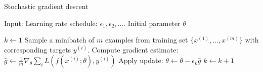 \begin{algorithm}
    \caption{Stochastic gradient descent}\label{alg:SGD}
    \begin{algorithmic}
        \State{} Input: Learning rate schedule: $\epsilon_1, \epsilon_2, \ldots$. Initial parameter $\theta$

        \State{} $k \leftarrow 1$
            \State{} Sample a minibatch of $m$ examples from training set $\{x^{(1)}, \ldots, x^{(m)}\}$ with corresponding targets $y^{(i)}$.
            \State{} Compute gradient estimate:
            \State{} $\hat{g} \leftarrow \frac{1}{m}\nabla_\theta \sum_i L(f(x^{(i)}; \theta), y^{(i)})$
            \State{} Apply update:
            \State{} $\theta \leftarrow \theta - \epsilon_k \hat{g}$
            \State{} $k \leftarrow k + 1$
        \EndWhile{}
\end{algorithmic}
\end{algorithm} 